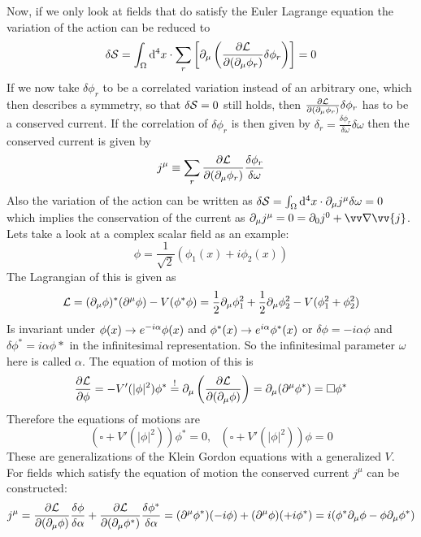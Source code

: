 Now, if we only look at fields that do satisfy the Euler Lagrange equation the variation of the action can be reduced to
\[ \delta \mathcal{S} = \int_\Omega {\rm d} ^4 x \cdot \sum_r \left[ \partial_\mu \left( \frac{\partial \mathcal{L}}{\partial( \partial_\mu \phi_r)} \delta \phi_r\right)\right] = 0\]
If we now take $\delta \phi_r$ to be a correlated variation instead of an arbitrary one, which then describes a symmetry, so that $\delta \mathcal{S} = 0$ still holds, then $\frac{\partial \mathcal{L}}{\partial ( \partial_\mu \phi_r)} \delta \phi_r$ has to be a conserved current. If the correlation of $\delta \phi_r$ is then given by $\delta_r = \frac{\delta \phi_r}{\delta \omega}\delta \omega$ then the conserved current is given by
\[ j^\mu \equiv \sum_r \frac{\partial \mathcal{L}}{\partial ( \partial_\mu \phi_r)} \frac{\delta \phi_r}{\delta \omega}\]
Also the variation of the action can be written as $\delta \mathcal{S} = \int_\Omega {\rm d}^4 x \cdot \partial_\mu j^\mu \delta \omega = 0$ which implies the conservation of the current as $\p_\mu j^\mu = 0 = \p_0 j^0 + \vn \vv{j}$.
Lets take a look at a complex scalar field as an example:
\[ \phi = \frac{1}{\sqrt{2}} ( \phi_1(x) + i \phi_2(x))\]
The Lagrangian of this is given as
\[ \mathcal{L} = ( \partial_\mu \phi)^*(\partial^\mu \phi) - V( \phi^*\phi) = \frac{1}{2} \partial_\mu \phi_1^2 + \frac{1}{2} \partial_\mu \phi_2^2 - V( \phi_1^2 + \phi_2^2)\]
Is invariant under $\phi(x) \rightarrow e^{-i\alpha} \phi(x)$ and $\phi^*(x) \rightarrow e^{i\alpha}\phi^*(x)$ or $\delta \phi = - i \alpha \phi$ and $\delta \phi^* = i \alpha \phi*$ in the infinitesimal representation. So the infinitesimal parameter $\omega$ here is called $\alpha$. The equation of motion of this is 
\[ \frac{\partial \mathcal{L}}{\partial \phi} = - V'( | \phi|^2) \phi^* \overset{!}{=} \partial_\mu \left( \frac{\partial \mathcal{L}}{\partial ( \partial_\mu \phi)}\right) = \partial_\mu ( \partial^\mu \phi^*) = \square \phi^*\]
Therefore the equations of motions are
\[ ( \square + V'(| \phi|^2)) \phi^* = 0, ~~~ ( \square + V'(|\phi|^2)) \phi = 0\]
These are generalizations of the Klein Gordon equations with a generalized $V$.\\
For fields which satisfy the equation of motion the conserved current $j^\mu$ can be constructed:
\[ j ^\mu = \frac{\partial \mathcal{L}}{\partial (\partial_\mu \phi)} \frac{\delta \phi}{\delta \alpha} + \frac{\partial \mathcal{L}}{\partial(\partial_\mu \phi^*)} \frac{\delta \phi^*}{\delta \alpha} = ( \partial^\mu \phi^*)(-i \phi) + ( \partial^\mu \phi) (+i \phi^*) = i ( \phi^* \partial_\mu \phi - \phi \partial_\mu \phi^*)\]
